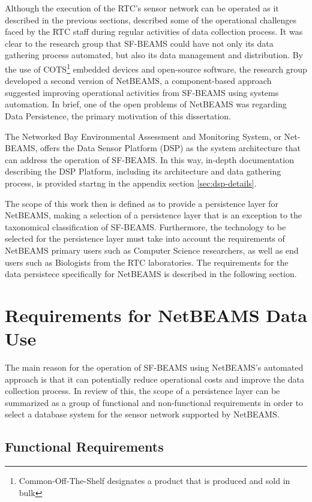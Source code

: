 Although the execution of the RTC's sensor network can be operated as it
described in the previous sections, \cite{netbeams2009} described some of the
operational challenges faced by the RTC staff during regular activities of
data collection process. It was clear to the research group that SF-BEAMS
could have not only its data gathering process automated, but also its data
management and distribution. By the use of COTS\footnote{Common-Off-The-Shelf
designates a product that is produced and sold in bulk} embedded devices and
open-source \cite{open-source} software, the research group developed a second
version of NetBEAMS, a component-based approach suggested improving operational
activities from SF-BEAMS using systems automation. In brief, one of the open
problems of NetBEAMS was regarding Data Persistence, the primary motivation of
this dissertation.

The Networked Bay Environmental Assessment and Monitoring System, or Net-BEAMS,
offers the Data Sensor Platform (DSP) \cite{netbeams2009} as the system
architecture that can address the operation of SF-BEAMS. In this way, in-depth
documentation describing the DSP Platform, including its architecture and data
gathering process, is provided startng in the appendix section
\ref{sec:dsp-details}.

The scope of this work then is defined as to provide a persistence layer for
NetBEAMS, making a selection of a persistence layer that is an exception to the
taxonomical classification of SF-BEAMS. Furthermore, the technology to be
selected for the persistence layer must take into account the requirements of
NetBEAMS primary users such as Computer Science researchers, as well as end
users such as Biologists from the RTC laboratories. The requirements for the
data persistece specifically for NetBEAMS is described in the following section.

\section{Requirements for NetBEAMS Data Use}

The main reason for the operation of SF-BEAMS using NetBEAMS's automated
approach is that it can potentially reduce operational costs and improve the
data collection process. In review of this, the scope of a persistence layer
can be summarized as a group of functional and non-functional requirements in
order to select a database system for the sensor network supported by NetBEAMS.

\subsection{Functional Requirements}

